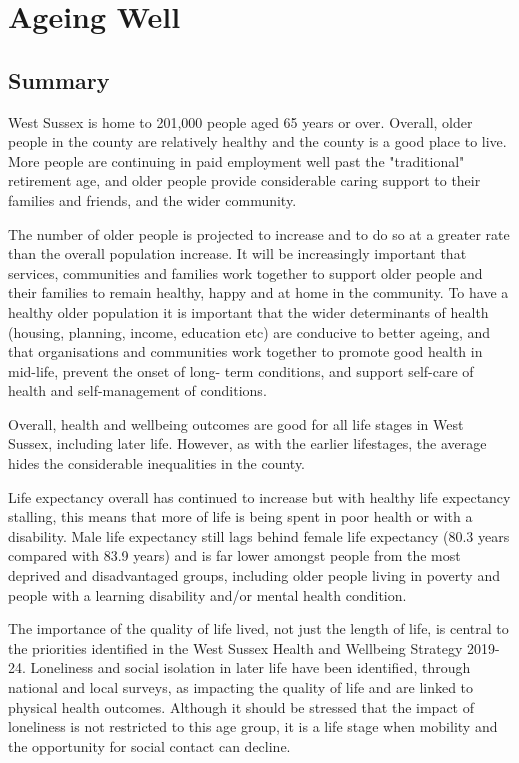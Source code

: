 \section{Ageing Well}
\subsection{Summary}

West Sussex is home to 201,000 people aged 65 years or over. Overall, older people in the county are relatively healthy and the county is a good place to live. More people are continuing in paid employment well past the "traditional" retirement age, and older people provide considerable caring support to their families and friends, and the wider community.

The number of older people is projected to increase and to do so at a greater rate than the overall population increase. It will be increasingly important that services, communities and families work together to support older people and their families to remain healthy, happy and at home in the community. To have a healthy older population it is important that the wider determinants of health (housing, planning, income, education etc) are conducive to better ageing, and that organisations and communities work together to promote good health in mid-life, prevent the onset of long- term conditions, and support self-care of health and self-management of conditions.

Overall, health and wellbeing outcomes are good for all life stages in West Sussex, including later life. However, as with the earlier lifestages, the average hides the considerable inequalities in the county.

Life expectancy overall has continued to increase but with healthy life expectancy stalling, this means that more of life is being spent in poor health or with a disability. Male life expectancy still lags behind female life expectancy (80.3 years compared with 83.9 years) and is far lower amongst people from the most deprived and disadvantaged groups, including older people living in poverty and people with a learning disability and/or mental health condition.

The importance of the quality of life lived, not just the length of life, is central to the priorities identified in the West Sussex Health and Wellbeing Strategy 2019-24. Loneliness and social isolation in later life have been identified, through national and local surveys, as impacting the quality of life and are linked to physical health outcomes. Although it should be stressed that the impact of loneliness is not restricted to this age group, it is a life stage when mobility and the opportunity for social contact can decline.

